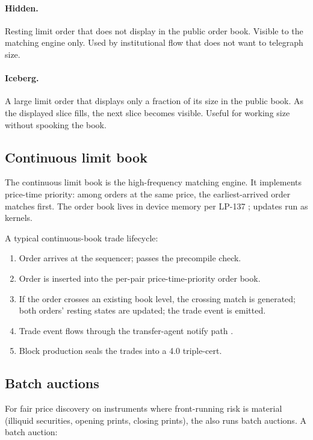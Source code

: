 \paragraph{Hidden.}
Resting limit order that does not display in the public order book.
Visible to the matching engine only. Used by institutional flow that
does not want to telegraph size.

\paragraph{Iceberg.}
A large limit order that displays only a fraction of its size in the
public book. As the displayed slice fills, the next slice becomes
visible. Useful for working size without spooking the book.

\subsection{Continuous limit book}

The continuous limit book is the high-frequency matching engine. It
implements price-time priority: among orders at the same price, the
earliest-arrived order matches first. The order book lives in device
memory per LP-137 \cite{lp-137}; updates run as \GPU{} kernels.

A typical continuous-book trade lifecycle:

\begin{enumerate}[leftmargin=1.4em]
  \item Order arrives at the sequencer; passes the \Liquidity{}
        precompile check.
  \item Order is inserted into the per-pair price-time-priority
        order book.
  \item If the order crosses an existing book level, the crossing
        match is generated; both orders' resting states are updated;
        the trade event is emitted.
  \item Trade event flows through the transfer-agent notify path
        \cite{liquidity-protocol-formal}.
  \item Block production seals the trades into a \Quasar{} 4.0
        triple-cert.
\end{enumerate}

\subsection{Batch auctions}

For fair price discovery on instruments where front-running risk is
material (illiquid securities, opening prints, closing prints), the
\DEX{} also runs batch auctions. A batch auction:

